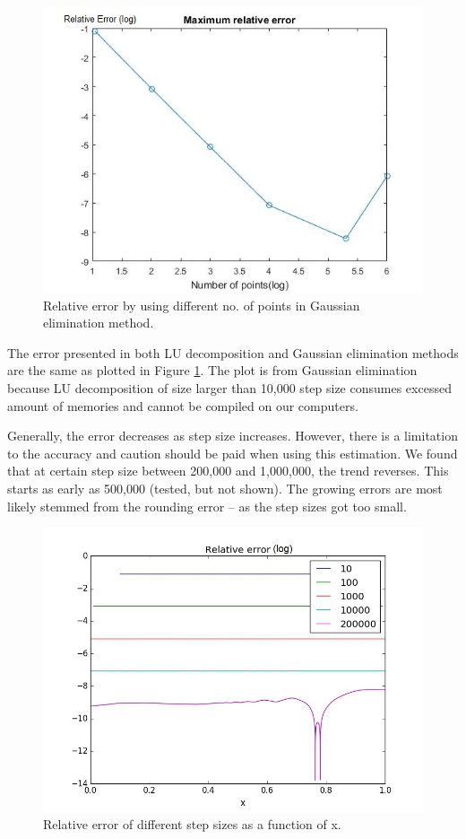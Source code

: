 \documentclass{article}
\begin{document}
  \begin{figure}[h]
  	\centering
  	\includegraphics[width=0.5\linewidth]{../figures/Err_Matlab}
  	\caption{Relative error by using different no. of points in Gaussian elimination method.}
  	\label{fig:Err_Matlab}
  \end{figure}
  
  The error presented in both LU decomposition and Gaussian elimination methods are the same as plotted in Figure \ref{fig:Err_Matlab}. The plot is from Gaussian elimination because LU decomposition of size larger than 10,000 step size consumes excessed amount of memories and cannot be compiled on our computers.
  
  Generally, the error decreases as step size increases. However, there is a limitation to the accuracy and caution should be paid when using this estimation. We found that at certain step size between 200,000 and 1,000,000, the trend reverses. This starts as early as 500,000 (tested, but not shown). The growing errors are most likely stemmed from the rounding error -- as the step sizes got too small. 
  
  
  \begin{figure}[h]
  	\centering
  	\includegraphics[width=0.5\linewidth]{../figures/Err_Python_200k}
  	\caption{Relative error of different step sizes as a function of x.}
  	\label{fig:Err_Python_200k}
  \end{figure}
  
\end{document}
